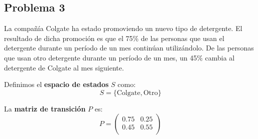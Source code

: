 \documentclass{article}
\begin{document}
\subsection{Problema 3}

La compañía Colgate ha estado promoviendo un nuevo tipo de detergente. El resultado de dicha promoción es que el 75\% de las personas que usan el detergente durante un período de un mes continúan utilizándolo. De las personas que usan otro detergente durante un período de un mes, un 45\% cambia al detergente de Colgate al mes siguiente.


Definimos el \textbf{espacio de estados} \( S \) como:
\[ S = \{ \text{Colgate}, \text{Otro} \} \]

La \textbf{matriz de transición} \( P \) es:
\[ P = \begin{pmatrix}
        0.75 & 0.25 \\
        0.45 & 0.55 \\
    \end{pmatrix} \]
\end{document}

